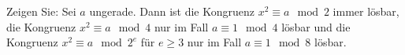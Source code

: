 
\begin{exercise}

Zeigen Sie: Sei $a$ ungerade. Dann ist die Kongruenz $x^2 \equiv a \mod{2}$ immer
lösbar, die Kongruenz $x^2 \equiv a \mod{4}$ nur im Fall $a \equiv 1 \mod{4}$ lösbar und
die Kongruenz $x^2 \equiv a \mod{2^e}$ für $e \geq 3$ nur im Fall $a \equiv 1 \mod{8}$ lösbar.

\end{exercise}


\begin{solution}

\phantom{}

\end{solution}

